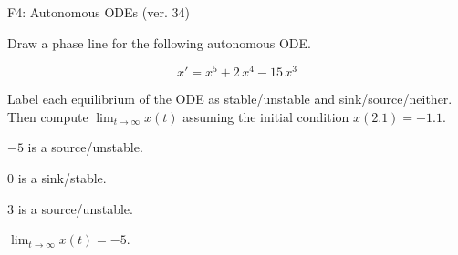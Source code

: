 \begin{exercise}
  \begin{exerciseTitle}F4: Autonomous ODEs (ver. 34)\end{exerciseTitle}
  \begin{exerciseStatement}
    

      Draw a phase line for the following 
      autonomous ODE.
    

    
\[x'= x^{5} + 2 \, x^{4} - 15 \, x^{3}\]

    

      Label each equilibrium of the ODE
      as stable/unstable and sink/source/neither.
      Then compute \(\lim_{t\to\infty}x(t)\)
      assuming the initial condition
      \(x( 2.1 )= -1.1\).
    

  \end{exerciseStatement}
  \begin{exerciseAnswer}
    

      \(-5\) is a source/unstable.
      
        \(0\) is a sink/stable.
      
      \(3\) is a source/unstable.
    

    

      \(\lim_{t\to\infty}x(t)=-5\).
    

  \end{exerciseAnswer}
\end{exercise}
